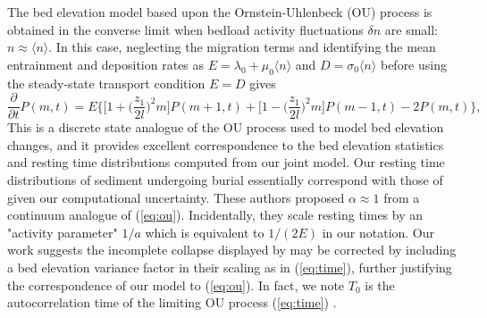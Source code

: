 \documentclass[draft]{agujournal2018}
\begin{document}
The \citet{Martin2014} bed elevation model based upon the Ornstein-Uhlenbeck (OU) process is obtained in the converse limit when bedload activity fluctuations $\delta n$ are small: $n \approx \langle n \rangle$.
In this case, neglecting the migration terms and identifying the mean entrainment and deposition rates as $E =\lambda_0 + \mu_0 \langle n \rangle$ and $D = \sigma_0 \langle n \rangle$ before using the steady-state transport condition $E=D$ \citep[e.g.][]{Einstein1950} gives
\begin{equation} \frac{\partial}{\partial t}P(m,t) =  E \Big\{ \Big[1 +\Big(\frac{z_1}{2 l}\Big)^2m\Big]P(m+1,t) +  \Big[1 -\Big(\frac{z_1}{2 l}\Big)^2m\Big]P(m-1,t) - 2P(m,t)\Big\}, \label{eq:ou}\end{equation}
This is a discrete state analogue of the OU process \citet{Martin2014} used to model bed elevation changes, and it provides excellent correspondence to the bed elevation statistics and resting time distributions computed from our joint model.
Our resting time distributions of sediment undergoing burial essentially correspond with those of \citet{Martin2014} given our computational uncertainty.
These authors proposed $\alpha \approx 1 $ from a continuum analogue of (\ref{eq:ou}).
Incidentally, they scale resting times by an "activity parameter" $1/a$ which is equivalent to $1/(2E)$ in our notation.
Our work suggests the incomplete collapse displayed by \citet{Martin2014} may be corrected by including a bed elevation variance factor in their scaling as in (\ref{eq:time}), further justifying the correspondence of our model to (\ref{eq:ou}).
In fact, we note $T_0$ is the autocorrelation time of the limiting OU process (\ref{eq:time}) \citep[e.g.][]{Gardiner1983}.
\end{document}
